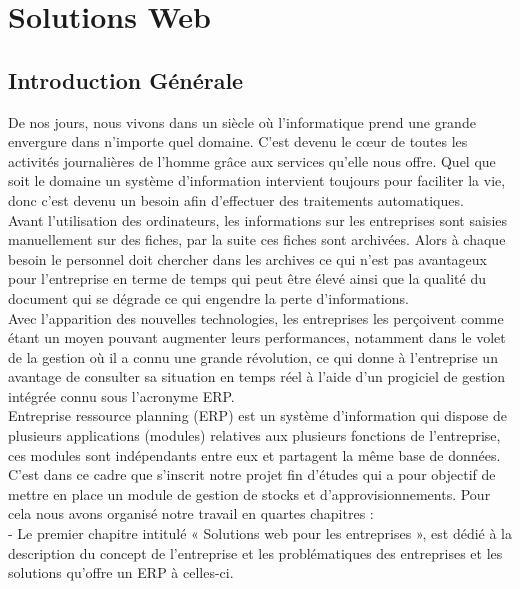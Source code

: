 \chapter{Solutions Web}

\section*{Introduction Générale}
De nos jours, nous vivons dans un siècle où l’informatique prend une grande envergure dans n’importe quel domaine. C’est devenu le cœur de toutes les activités journalières de l’homme grâce aux services qu’elle nous offre. Quel que soit le domaine un système d’information intervient toujours pour faciliter la vie, donc c’est devenu un besoin afin d’effectuer des traitements automatiques.\\

Avant l’utilisation des ordinateurs, les informations sur les entreprises sont saisies manuellement sur des fiches, par la suite ces fiches sont archivées. Alors à chaque besoin le personnel doit chercher dans les archives ce qui n’est pas avantageux pour l’entreprise en terme de temps qui peut être élevé ainsi que la qualité du document qui se dégrade ce qui engendre la perte d’informations. \\

Avec l’apparition des nouvelles technologies, les entreprises les perçoivent comme étant un moyen pouvant augmenter leurs performances, notamment dans le volet de la gestion où il a connu une grande révolution, ce qui donne à l’entreprise un avantage de consulter sa situation en temps réel à l’aide d’un progiciel de gestion intégrée connu sous l’acronyme ERP.\\

Entreprise ressource planning (ERP) est un système d’information qui dispose de plusieurs applications (modules) relatives aux plusieurs fonctions de l’entreprise, ces modules sont indépendants entre eux et partagent la même base de données.\\

C’est dans ce cadre que s’inscrit notre projet fin d’études qui a pour objectif de mettre en place un module de gestion de stocks et d’approvisionnements. Pour cela nous avons organisé notre travail en quartes chapitres :\\

- Le premier chapitre intitulé « Solutions web pour les entreprises », est dédié à la description du concept de l’entreprise et les problématiques des entreprises et les solutions qu’offre un ERP à celles-ci.\\

